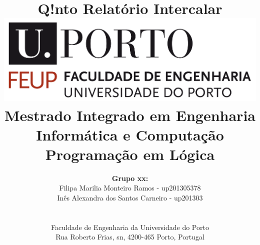 \documentclass[a4paper]{article}
\begin{document}
\setlength{\textwidth}{16cm}
\setlength{\textheight}{22cm}

\title{\Huge\textbf{Q!nto}\linebreak\linebreak\linebreak
\Large\textbf{Relatório Intercalar}\linebreak\linebreak
\linebreak\linebreak
\includegraphics[scale=0.1]{feup-logo.png}\linebreak\linebreak
\linebreak\linebreak
\Large{Mestrado Integrado em Engenharia Informática e Computação} \linebreak\linebreak
\Large{Programação em Lógica}\linebreak
}

\author{\textbf{Grupo xx:}\\
Filipa Marilia Monteiro Ramos - up201305378 \\
Inês Alexandra dos Santos Carneiro - up201303 \\
\linebreak\linebreak \\
 \\ Faculdade de Engenharia da Universidade do Porto \\ Rua Roberto Frias, s\/n, 4200-465 Porto, Portugal \linebreak\linebreak\linebreak
\linebreak\linebreak\vspace{1cm}}

\maketitle
\thispagestyle{empty}
\end{document}
